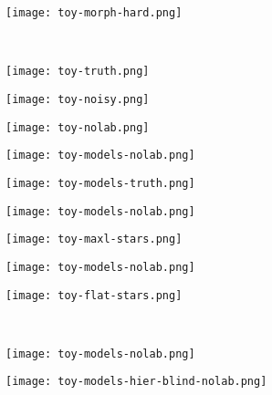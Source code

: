 \documentclass{beamer}
\begin{document}
\begin{frame}
\texttt{[image: toy-morph-hard.png]}
\end{frame}

\whiteonblack
\begin{frame}
~
\end{frame}
\blackonwhite

\begin{frame}
\texttt{[image: toy-truth.png]}
\end{frame}

\begin{frame}
\texttt{[image: toy-noisy.png]}
\end{frame}

\begin{frame}
\texttt{[image: toy-nolab.png]}
\end{frame}

\begin{frame}
\texttt{[image: toy-models-nolab.png]}
\end{frame}

\begin{frame}
\texttt{[image: toy-models-truth.png]}
\end{frame}

\begin{frame}
\texttt{[image: toy-models-nolab.png]}
\end{frame}

\begin{frame}
\texttt{[image: toy-maxl-stars.png]}
\end{frame}

\begin{frame}
\texttt{[image: toy-models-nolab.png]}
\end{frame}

\begin{frame}
\texttt{[image: toy-flat-stars.png]}
\end{frame}

\whiteonblack
\begin{frame}
~
\end{frame}
\blackonwhite

\begin{frame}
\texttt{[image: toy-models-nolab.png]}
\end{frame}

\begin{frame}
\texttt{[image: toy-models-hier-blind-nolab.png]}
\end{frame}
\end{document}

